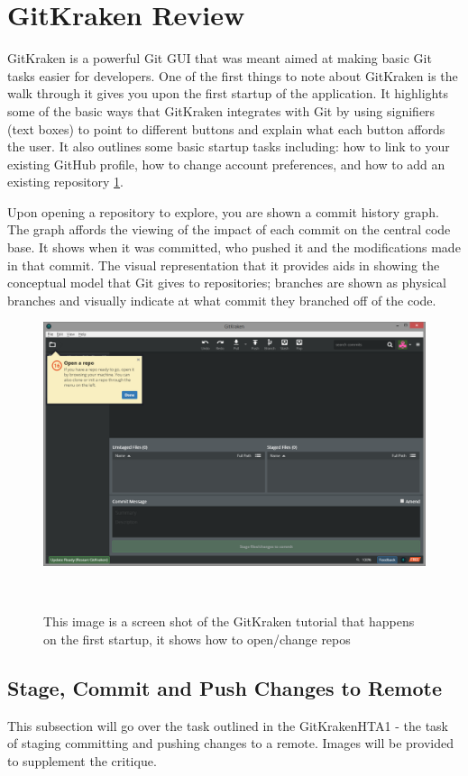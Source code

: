 \documentclass{sigchi}
\begin{document}
\section{GitKraken Review}
GitKraken is a powerful Git GUI that was meant aimed at making basic Git tasks easier for developers.
One of the first things to note about GitKraken is the walk through it gives you upon the
first startup of the application. It highlights some of the basic ways that GitKraken integrates with Git by
using signifiers (text boxes) to point to different buttons and explain what each button affords the user.
It also outlines some basic startup tasks including: how to link to your existing GitHub profile, how to change
account preferences, and how to add an existing repository \ref{fig:GitKrakenFigure1}.

Upon opening a repository to explore, you are shown a commit history graph. The graph affords the viewing of 
the impact of each commit on the central code base. It shows when it was committed, who pushed it and
the modifications made in that commit. The visual representation that it provides aids in showing the 
conceptual model that Git gives to repositories; branches are shown as physical branches and visually indicate
at what commit they branched off of the code.

\begin{figure}
  \centering
  \includegraphics[width=1.75\columnwidth]{figures/GitKraken/Open_a_repo}
  \caption{This image is a screen shot of the GitKraken tutorial that happens on the first startup, it shows how to open/change repos}~\label{fig:GitKrakenFigure1}
\end{figure}

\subsection{Stage, Commit and Push Changes to Remote}
This subsection will go over the task outlined in the GitKrakenHTA1 - the task of staging committing 
and pushing changes to a remote. Images will be provided to supplement the critique. 
\end{document}
